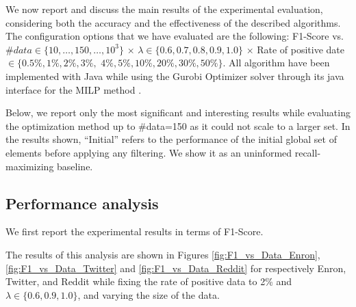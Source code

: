 
We now report and discuss the main results of the experimental evaluation, considering both the accuracy and the effectiveness of the described algorithms. The configuration options that we have evaluated are the following: F1-Score vs. $\#data \in \{10,\dots, 150,\dots, 10^3\}$ $\times$ $ \lambda \in \{  0.6,0.7,0.8,0.9,1.0 \}$ $\times$ Rate of positive date $\in \{0.5\%, 1\%, 2\%, 3\%,$ $ 4\%, 5\%, 10\%, 20\%, 30\%, 50\%\}$. All algorithm have been implemented with Java while using the Gurobi Optimizer solver through its java interface for the MILP method \cite{gurobi2017gurobi}.

Below, we report only the most significant and interesting results while evaluating the optimization method up to \#data=150 as it could not scale to a larger set. In the results shown, \textquotedblleft Initial\textquotedblright{} refers to the performance of the initial global set of elements before applying any filtering.  We show it as an uninformed recall-maximizing baseline.




\subsection{Performance analysis}
We first report the experimental results in terms of F1-Score.



 The results of this analysis are shown in Figures \ref{fig:F1_vs_Data_Enron}, \ref{fig:F1_vs_Data_Twitter} and \ref{fig:F1_vs_Data_Reddit} for respectively Enron, Twitter, and Reddit while fixing the rate of positive data to 2\% and $\lambda \in \{0.6,0.9,1.0\}$, and  varying the size of the data.



